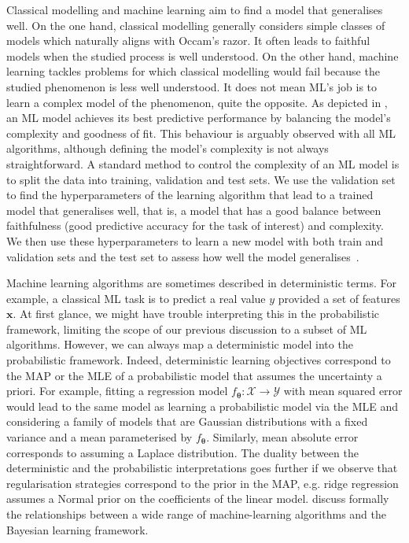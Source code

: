 Classical modelling and machine learning aim to find a model that generalises well.
On the one hand, classical modelling generally considers simple classes of models which naturally aligns with Occam's razor. It often leads to faithful models when the studied process is well understood. On the other hand, machine learning tackles problems for which classical modelling would fail because the studied phenomenon is less well understood. It does not mean ML's job is to learn a complex model of the phenomenon, quite the opposite. As depicted in , an ML model achieves its best predictive performance by balancing the model's complexity and goodness of fit. This behaviour is arguably observed with all ML algorithms, although defining the model's complexity is not always straightforward. A standard method to control the complexity of an ML model is to split the data into training, validation and test sets. We use the validation set to find the hyperparameters of the learning algorithm that lead to a trained model that generalises well, that is, a model that has a good balance between faithfulness (good predictive accuracy for the task of interest) and complexity. We then use these hyperparameters to learn a new model with both train and validation sets and the test set to assess how well the model generalises~\citep{hastie2009elements}.

Machine learning algorithms are sometimes described in deterministic terms. For example, a classical ML task is to predict a real value $y$ provided a set of features $\bm x$. At first glance, we might have trouble interpreting this in the probabilistic framework, limiting the scope of our previous discussion to a subset of ML algorithms. However, we can always map a deterministic model into the probabilistic framework. Indeed, deterministic learning objectives correspond to the MAP or the MLE of a probabilistic model that assumes the uncertainty a priori. For example, fitting a regression model $f_{\bm {\theta}}: \mathcal{X} \rightarrow \mathcal{Y}$ with mean squared error would lead to the same model as learning a probabilistic model via the MLE and considering a family of models that are Gaussian distributions with a fixed variance and a mean parameterised by $f_{\bm {\theta}}$. Similarly, mean absolute error corresponds to assuming a Laplace distribution. The duality between the deterministic and the probabilistic interpretations goes further if we observe that regularisation strategies correspond to the prior in the MAP, e.g. ridge regression assumes a Normal prior on the coefficients of the linear model. \citet{khan2021bayesian} discuss formally the relationships between a wide range of machine-learning algorithms and the Bayesian learning framework.

